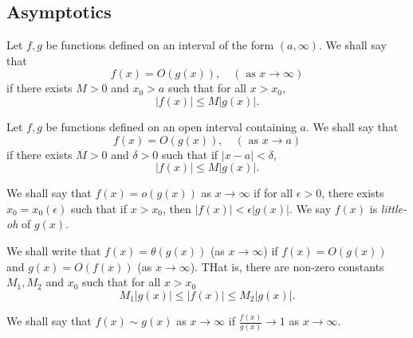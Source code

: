 \subsection{Asymptotics}

\begin{definition}[Big-Oh]
    Let \(f, g\) be functions defined on an interval of the form \((a, \infty)\). We shall say that
    \[f(x) = O(g(x)), \quad (\text{ as } x \to \infty)\]
    if there exists \(M > 0\) and \(x_0 > a\) such that for all \(x > x_0\),
    \[|f(x)| \leq M|g(x)|.\]
\end{definition}

\begin{definition}[Big-Oh at \(a\)]
    Let \(f, g\) be functions defined on an open interval containing \(a\). We shall say that
    \[f(x) = O(g(x)), \quad (\text{ as } x \to a)\]
    if there exists \(M > 0\) and \(\delta > 0\) such that if \(|x - a| < \delta\),
    \[|f(x)| \leq M|g(x)|.\]
\end{definition}

\begin{definition}
    We shall say that \(f(x) = o(g(x))\) as \(x \to \infty\) if for all \(\epsilon > 0\), there exists \(x_0 = x_0(\epsilon)\) such that if \(x > x_0\), then \(|f(x)| < \epsilon|g(x)|\). We say \(f(x)\) is \textit{little-oh} of \(g(x)\).
\end{definition}

\begin{definition}
    We shall write that \(f(x) = \theta(g(x))\) (as \(x \to \infty\)) if \(f(x) = O(g(x))\) and \(g(x) = O(f(x))\) (as \(x \to \infty\)). THat is, there are non-zero constants \(M_1, M_2\) and \(x_0\) such that for all \(x > x_0\)
    \[M_1|g(x)| \leq |f(x)| \leq M_2|g(x)|.\]
\end{definition}

\begin{definition}
    We shall say that \(f(x) \sim g(x)\) as \(x \to \infty\) if \(\frac{f(x)}{g(x)} \to 1\) as \(x \to \infty\).
\end{definition}

\pagebreak